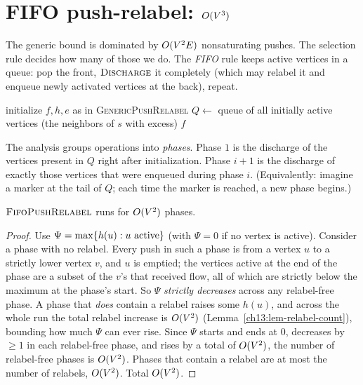 \section{FIFO push-relabel: \texorpdfstring{$O(V^3)$}{O(V cubed)}}
\label{ch13:fifo}

The generic bound is dominated by $O(V^2E)$ nonsaturating pushes. The selection rule decides how many of those we do. The \emph{FIFO} rule keeps active vertices in a queue: pop the front, $\textsc{Discharge}$ it completely (which may relabel it and enqueue newly activated vertices at the back), repeat.

\begin{algorithm}[H]
\caption{$\textsc{FifoPushRelabel}(G,s,t)$}
\label{ch13:alg-fifo}
\DontPrintSemicolon
initialize $f,h,e$ as in \textsc{GenericPushRelabel}\;
$Q \gets$ queue of all initially active vertices (the neighbors of $s$ with excess)\;
\Return $f$\;
\end{algorithm}

The analysis groups operations into \emph{phases}. Phase $1$ is the discharge of the vertices present in $Q$ right after initialization. Phase $i+1$ is the discharge of exactly those vertices that were enqueued during phase $i$. (Equivalently: imagine a marker at the tail of $Q$; each time the marker is reached, a new phase begins.)

\begin{lemma}
\label{ch13:lem-phases}
$\textsc{FifoPushRelabel}$ runs for $O(V^2)$ phases.
\end{lemma}

\begin{proof}
Use $\Psi=\max\{h(u):u\text{ active}\}$ (with $\Psi=0$ if no vertex is active). Consider a phase with no relabel. Every push in such a phase is from a vertex $u$ to a strictly lower vertex $v$, and $u$ is emptied; the vertices active at the end of the phase are a subset of the $v$'s that received flow, all of which are strictly below the maximum at the phase's start. So $\Psi$ \emph{strictly decreases} across any relabel-free phase. A phase that \emph{does} contain a relabel raises some $h(u)$, and across the whole run the total relabel increase is $O(V^2)$ (Lemma~\ref{ch13:lem-relabel-count}), bounding how much $\Psi$ can ever rise. Since $\Psi$ starts and ends at $0$, decreases by $\ge1$ in each relabel-free phase, and rises by a total of $O(V^2)$, the number of relabel-free phases is $O(V^2)$. Phases that contain a relabel are at most the number of relabels, $O(V^2)$. Total $O(V^2)$.
\end{proof}

